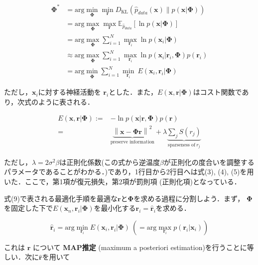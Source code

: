 \begin{align}
\mathbf{\Phi}^*&=\text{arg} \min_{\mathbf{\Phi}} \min_{\mathbf{r}} D_{\text{KL}}\left(\hat{p}_{data}(\mathbf{x}) \| p(\mathbf{x}|\mathbf{\Phi})\right)\\
&=\text{arg} \max_{\mathbf{\Phi}} \max_{\mathbf{r}} \mathbb{E}_{\hat{p}_{data}} \left[\ln p(\mathbf{x}|\mathbf{\Phi})\right]\\
&= \text{arg} \max_{\mathbf{\Phi}}\sum_{i=1}^N \max_{\mathbf{r}_i} \ln p(\mathbf{x}_i|\mathbf{\Phi})\\
&\approx \text{arg} \max_{\mathbf{\Phi}}\sum_{i=1}^N \max_{\mathbf{r}_i} \ln p(\mathbf{x}_i|\mathbf{r}_i, \mathbf{\Phi})p(\mathbf{r}_i)\\
&=\text{arg}\min_{\mathbf{\Phi}} \sum_{i=1}^N \min_{\mathbf{r}_i}\ E(\mathbf{x}_i, \mathbf{r}_i|\mathbf{\Phi})
\end{align}


ただし，$\mathbf{x}_i$に対する神経活動を $\mathbf{r}_i$とした．また，$E(\mathbf{x}, \mathbf{r}|\mathbf{\Phi})$はコスト関数であり，次式のように表される．


\begin{align}
E(\mathbf{x}, \mathbf{r}|\mathbf{\Phi}):=&-\ln p(\mathbf{x}|\mathbf{r}, \mathbf{\Phi})p(\mathbf{r})\\
=&\underbrace{\left\|\mathbf{x}-\mathbf{\Phi} \mathbf{r}\right\|^2}_{\text{preserve information}} + \lambda \underbrace{\sum_j S\left(r_j\right)}_{\text{sparseness of}\ r_j}
\end{align}


ただし，$\lambda=2\sigma^2\beta$は正則化係数(この式から逆温度$\beta$が正則化の度合いを調整するパラメータであることがわかる．)であり，1行目から2行目へは式(3), (4), (5)を用いた．ここで，第1項が復元損失，第2項が罰則項 (正則化項)となっている．

式(9)で表される最適化手順を最適な$\mathbf{r}$と$\mathbf{\Phi}$を求める過程に分割しよう．まず， $\mathbf{\Phi}$を固定した下で$E(\mathbf{x}_n, \mathbf{r}_i|\mathbf{\Phi})$を最小化する$\mathbf{r}_i=\hat{\mathbf{r}}_i$を求める．


\begin{equation}
\hat{\mathbf{r}}_i=\text{arg}\min_{\mathbf{r}_i}E(\mathbf{x}_i, \mathbf{r}_i|\mathbf{\Phi})\ \left(= \text{arg}\max_{\mathbf{r}_i}p(\mathbf{r}_i|\mathbf{x}_i)\right)
\end{equation}


これは $\mathbf{r}$ について \textbf{MAP推定} (maximum a posteriori estimation)を行うことに等しい．次に$\hat{\mathbf{r}}$を用いて


